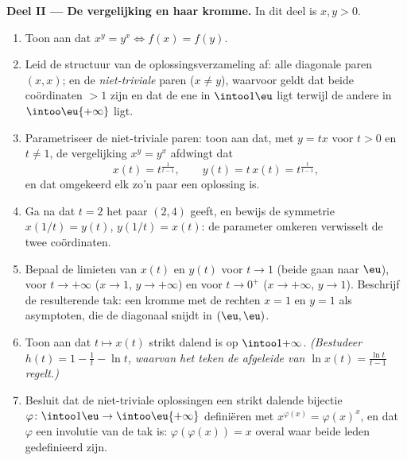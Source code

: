 \begin{problem}
\medskip
\noindent\textbf{Deel II --- De vergelijking en haar kromme.} In dit
deel is $x, y > 0$.
\begin{enumerate}[resume]
  \item Toon aan dat $x^y = y^x \iff f(x) = f(y)$.
  \item Leid de structuur van de oplossingsverzameling af: alle
        diagonale paren $(x, x)$; en de \emph{niet-triviale} paren ($x
        \neq y$), waarvoor geldt dat beide coördinaten $> 1$ zijn en
        dat de ene in $\intoo1\eu$ ligt terwijl de andere in
        $\intoo\eu{+\infty}$ ligt.
  \item Parametriseer de niet-triviale paren: toon aan dat, met $y =
        tx$ voor $t > 0$ en $t \neq 1$, de vergelijking $x^y = y^x$
        afdwingt dat
        \[
        x(t) = t^{\frac1{t-1}},
        \qquad
        y(t) = t\,x(t) = t^{\frac{t}{t-1}},
        \]
        en dat omgekeerd elk zo'n paar een oplossing is.
  \item Ga na dat $t = 2$ het paar $(2, 4)$ geeft, en bewijs de
        symmetrie $x(1/t) = y(t)$, $y(1/t) = x(t)$: de parameter
        omkeren verwisselt de twee coördinaten.
  \item Bepaal de limieten van $x(t)$ en $y(t)$ voor $t \to 1$ (beide
        gaan naar $\eu$), voor $t \to +\infty$ ($x \to 1$, $y \to
        +\infty$) en voor $t \to 0^+$ ($x \to +\infty$, $y \to 1$).
        Beschrijf de resulterende tak: een kromme met de rechten $x =
        1$ en $y = 1$ als asymptoten, die de diagonaal snijdt in $(\eu,
        \eu)$.
  \item Toon aan dat $t \mapsto x(t)$ strikt dalend is op
        $\intoo1{+\infty}$. \emph{(Bestudeer $h(t) = 1 - \frac1t - \ln
        t$, waarvan het teken de afgeleide van $\ln x(t) = \frac{\ln
        t}{t - 1}$ regelt.)}
  \item Besluit dat de niet-triviale oplossingen een strikt dalende
        bijectie $\varphi \colon \intoo1\eu \to \intoo\eu{+\infty}$
        definiëren met $x^{\varphi(x)} = \varphi(x)^x$, en dat $\varphi$
        een involutie van de tak is: $\varphi(\varphi(x)) = x$ overal
        waar beide leden gedefinieerd zijn.
\end{enumerate}


\end{problem}
